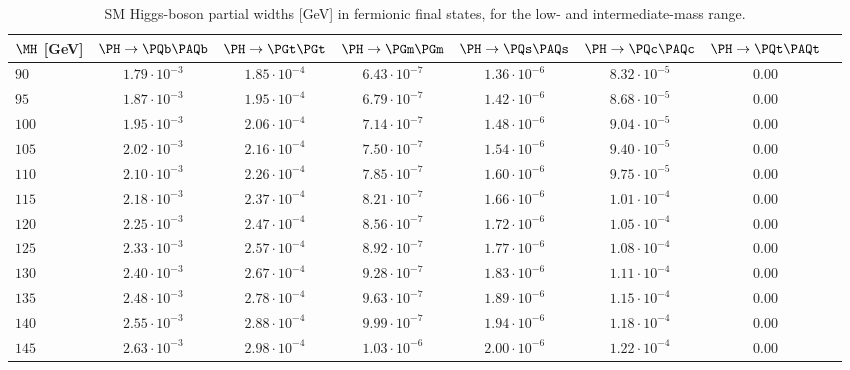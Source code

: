 \begin{table}
  \vspace{-\headsep}
  \caption{SM Higgs-boson partial widths [GeV] in fermionic final states, for the low- and intermediate-mass range.}
  \label{tab:Width-lm.part1}
  \centering
  \small
  \begin{tabular}{lccccccc}\hline
$\MH$ [GeV] & $\PH \rightarrow \PQb\PAQb$ &  $\PH \rightarrow \PGt \PGt$ 
& $\PH \rightarrow \PGm \PGm$ & $\PH \rightarrow \PQs \PAQs$ & 
$\PH \rightarrow \PQc \PAQc$
& $\PH \rightarrow \PQt \PAQt$ \\
\hline
$90 $&$ 1.79\cdot 10^{-3} $&$ 1.85\cdot 10^{-4} $&$ 6.43 \cdot 10^{-7} $&$ 1.36\cdot 10^{-6} $&$ 8.32\cdot 10^{-5} $&$ 0.00  $\\
$95 $&$ 1.87\cdot 10^{-3} $&$ 1.95\cdot 10^{-4} $&$ 6.79 \cdot 10^{-7} $&$ 1.42\cdot 10^{-6} $&$ 8.68\cdot 10^{-5} $&$ 0.00  $\\
$100 $&$ 1.95\cdot 10^{-3} $&$ 2.06\cdot 10^{-4} $&$ 7.14 \cdot 10^{-7} $&$ 1.48\cdot 10^{-6} $&$ 9.04\cdot 10^{-5} $&$ 0.00  $\\
$105 $&$ 2.02\cdot 10^{-3} $&$ 2.16\cdot 10^{-4} $&$ 7.50 \cdot 10^{-7} $&$ 1.54\cdot 10^{-6} $&$ 9.40\cdot 10^{-5} $&$ 0.00  $\\
$110 $&$ 2.10\cdot 10^{-3} $&$ 2.26\cdot 10^{-4} $&$ 7.85 \cdot 10^{-7} $&$ 1.60\cdot 10^{-6} $&$ 9.75\cdot 10^{-5} $&$ 0.00  $\\
$115 $&$ 2.18\cdot 10^{-3} $&$ 2.37\cdot 10^{-4} $&$ 8.21 \cdot 10^{-7} $&$ 1.66\cdot 10^{-6} $&$ 1.01\cdot 10^{-4} $&$ 0.00  $\\
$120 $&$ 2.25\cdot 10^{-3} $&$ 2.47\cdot 10^{-4} $&$ 8.56 \cdot 10^{-7} $&$ 1.72\cdot 10^{-6} $&$ 1.05\cdot 10^{-4} $&$ 0.00  $\\
$125 $&$ 2.33\cdot 10^{-3} $&$ 2.57\cdot 10^{-4} $&$ 8.92 \cdot 10^{-7} $&$ 1.77\cdot 10^{-6} $&$ 1.08\cdot 10^{-4} $&$ 0.00  $\\
$130 $&$ 2.40\cdot 10^{-3} $&$ 2.67\cdot 10^{-4} $&$ 9.28 \cdot 10^{-7} $&$ 1.83\cdot 10^{-6} $&$ 1.11\cdot 10^{-4} $&$ 0.00  $\\
$135 $&$ 2.48\cdot 10^{-3} $&$ 2.78\cdot 10^{-4} $&$ 9.63 \cdot 10^{-7} $&$ 1.89\cdot 10^{-6} $&$ 1.15\cdot 10^{-4} $&$ 0.00  $\\
$140 $&$ 2.55\cdot 10^{-3} $&$ 2.88\cdot 10^{-4} $&$ 9.99 \cdot 10^{-7} $&$ 1.94\cdot 10^{-6} $&$ 1.18\cdot 10^{-4} $&$ 0.00  $\\
$145 $&$ 2.63\cdot 10^{-3} $&$ 2.98\cdot 10^{-4} $&$ 1.03\cdot 10^{-6} $&$ 2.00\cdot 10^{-6} $&$ 1.22\cdot 10^{-4} $&$ 0.00  $\\

\end{tabular}
\end{table}
